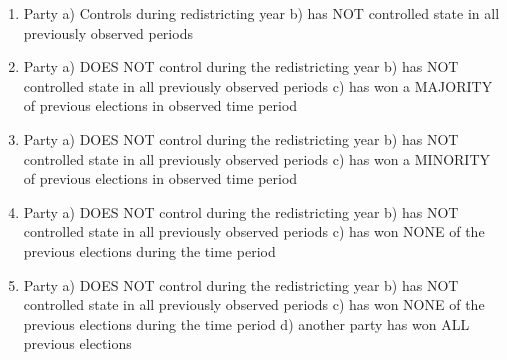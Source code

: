 \documentclass[
]{article}
\newenvironment{Shaded}{\begin{snugshade}}{\end{snugshade}}
\newcommand{\CommentTok}[1]{\textcolor[rgb]{0.56,0.35,0.01}{\textit{#1}}}
\newcommand{\DataTypeTok}[1]{\textcolor[rgb]{0.13,0.29,0.53}{#1}}
\newcommand{\DecValTok}[1]{\textcolor[rgb]{0.00,0.00,0.81}{#1}}
\newcommand{\KeywordTok}[1]{\textcolor[rgb]{0.13,0.29,0.53}{\textbf{#1}}}
\newcommand{\NormalTok}[1]{#1}
\newcommand{\OperatorTok}[1]{\textcolor[rgb]{0.81,0.36,0.00}{\textbf{#1}}}
\newcommand{\OtherTok}[1]{\textcolor[rgb]{0.56,0.35,0.01}{#1}}
\newcommand{\StringTok}[1]{\textcolor[rgb]{0.31,0.60,0.02}{#1}}
\begin{document}
\begin{enumerate}
\def\labelenumi{\arabic{enumi}.}
\setcounter{enumi}{1}
\item
  Party a) Controls during redistricting year b) has NOT controlled
  state in all previously observed periods
\item
  Party a) DOES NOT control during the redistricting year b) has NOT
  controlled state in all previously observed periods c) has won a
  MAJORITY of previous elections in observed time period
\item
  Party a) DOES NOT control during the redistricting year b) has NOT
  controlled state in all previously observed periods c) has won a
  MINORITY of previous elections in observed time period
\item
  Party a) DOES NOT control during the redistricting year b) has NOT
  controlled state in all previously observed periods c) has won NONE of
  the previous elections during the time period
\item
  Party a) DOES NOT control during the redistricting year b) has NOT
  controlled state in all previously observed periods c) has won NONE of
  the previous elections during the time period d) another party has won
  ALL previous elections
\end{enumerate}

\begin{Shaded}
\end{Shaded}
\end{document}
